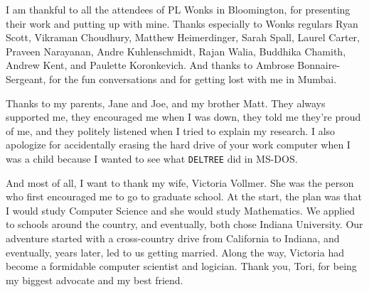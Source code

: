 \documentclass[showabstract,showacknowledgments,showpreface,showdedication,school]{iuphd}
\theoremstyle{nonumberplain}
\begin{document}
\begin{acknowledgments}
  I am thankful to all the attendees of PL Wonks in Bloomington, for presenting
  their work and putting up with mine. Thanks especially to Wonks regulars Ryan
  Scott, Vikraman Choudhury, Matthew Heimerdinger, Sarah Spall, Laurel Carter,
  Praveen Narayanan, Andre Kuhlenschmidt, Rajan Walia, Buddhika Chamith, Andrew
  Kent, and Paulette Koronkevich. And thanks to Ambrose Bonnaire-Sergeant, for the
  fun conversations and for getting lost with me in Mumbai.

  Thanks to my parents, Jane and Joe, and my brother Matt. They always supported
  me, they encouraged me when I was down, they told me they're proud of me, and
  they politely listened when I tried to explain my research. I also apologize for
  accidentally erasing the hard drive of your work computer when I was a child because I
  wanted to see what \texttt{DELTREE} did in MS-DOS.

  And most of all, I want to thank my wife, Victoria Vollmer. She was the person
  who first encouraged me to go to graduate school. At the start, the plan was
  that I would study Computer Science and she would study Mathematics. We applied
  to schools around the country, and eventually, both chose Indiana University. Our
  adventure started with a cross-country drive from California to Indiana, and
  eventually, years later, led to us getting married. Along the way, Victoria had
  become a formidable computer scientist and logician. Thank you, Tori, for being
  my biggest advocate and my best friend.

\end{acknowledgments}







\begin{abstract}
  
In a typical data-processing application, the representation of data in memory is distinct from its representation in a serialized form on disk. The former has pointers and an arbitrary, sparse layout, facilitating easier manipulation by a program, while the latter is packed contiguously, facilitating easier I/O. I propose a programming language, LoCal, that unifies the in-memory and on-disk representations of data. LoCal extends prior work on region calculi into a location calculus, employing a type system that tracks the byte-addressed layout of all heap values.
I present the formal semantics of LoCal and prove type safety, and show how to infer LoCal programs from unannotated source terms. Then, I demonstrate how to efficiently implement LoCal in a practical compiler that produces code competitive with hand-written C.
\linebreak\vspace{1em}

\end{abstract}
\end{document}
